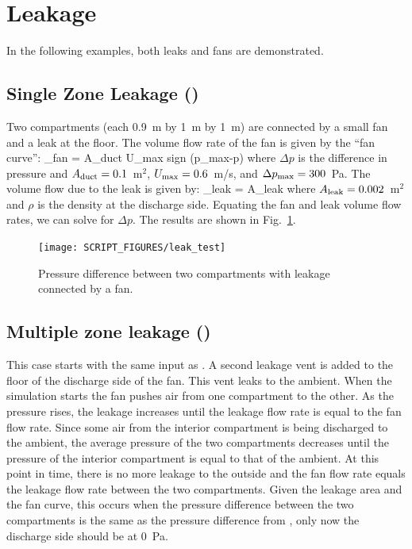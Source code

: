 \documentclass[11pt]{book}
\begin{document}
\section{Leakage}

In the following examples, both leaks and fans are demonstrated.

\subsection{Single Zone Leakage (\texorpdfstring{}{leak\_test})}
\label{single_zone_leak}
\label{leak_test}

Two compartments (each 0.9~m by 1~m by 1~m) are connected by a small fan and a leak at the floor. The volume flow rate of the fan is given by the ``fan curve'':
\be
  _{\hbox{\footnotesize fan}} = A_{\hbox{\footnotesize duct}}
  U_{\hbox{\footnotesize max}} \;
   \hbox{sign} (\Delta p_{\hbox{\footnotesize max}}-\Delta p)
\ee
where $\Delta p$ is the difference in pressure and $A_{\hbox{\scriptsize duct}}=0.1$~m$^2$, $U_{\hbox{\scriptsize max}}=0.6$~m/s, and $\Delta p_{\hbox{\scriptsize max}}=300$~Pa. The volume flow due to the leak is given by:
\be
   _{\hbox{\scriptsize leak}} = A_{\hbox{\scriptsize leak}} 
\ee
where $A_{\hbox{\scriptsize leak}}=0.002$~m$^2$ and $\rho$ is the density at the discharge side. Equating the fan and leak volume flow rates, we can solve for $\Delta p$. The results are shown in Fig.~\ref{leak_test_fig}.

\begin{figure}[ht]
\centering
\texttt{[image: SCRIPT\_FIGURES/leak\_test]}
\caption[The  case]{Pressure difference between two compartments with leakage connected by a fan.}
\label{leak_test_fig}
\end{figure}

\subsection{Multiple zone leakage (\texorpdfstring{}{leak\_test\_2})}
\label{leak_test_2}

This case starts with the same input as .  A second leakage vent is added to the floor of the discharge side of the fan.  This vent leaks to the ambient.  When the simulation starts the fan pushes air from one compartment to the other. As the pressure rises, the leakage increases until the leakage flow rate is equal to the fan flow rate. Since some air from the interior compartment is being discharged to the ambient, the average pressure of the two compartments decreases until the pressure of the interior compartment is equal to that of the ambient. At this point in time, there is no more leakage to the outside and the fan flow rate equals the leakage flow rate between the two compartments.  Given the leakage area and the fan curve, this occurs when the pressure difference between the two compartments is the same as the pressure difference from , only now the discharge side should be at 0~Pa.
\end{document}
